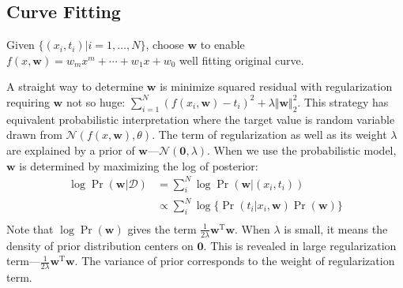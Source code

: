 \subsection{Curve Fitting}
Given $\{(x_{i},t_{i})|i=1,\ldots,N\}$, choose $\mathbf{w}$ to enable $f(x,\mathbf{w})=w_{m}x^{m}+\cdots+w_{1}x+w_0$ well fitting original curve.



A straight way to determine $\mathbf{w}$ is minimize squared residual with regularization requiring $\mathbf{w}$ not so huge: $\sum_{i=1}^{N}(f(x_i,\mathbf{w})-t_i)^{2}+\lambda\Vert\mathbf{w}\Vert_2^2$. 
This strategy has equivalent probabilistic interpretation where the target value is random variable drawn from $\mathcal{N}(f(x,\mathbf{w}),\theta)$. 
The term of regularization as well as its weight $\lambda$ are explained by a prior of $\mathbf{w}$---$\mathcal{N}(\mathbf{0},\lambda)$.
When we use the probabilistic model, $\mathbf{w}$ is determined by maximizing the log of posterior:
\begin{equation}
\begin{split}
\log\Pr(\mathbf{w}|\mathcal{D})&=\sum_{i}^{N}\log\Pr(\mathbf{w}|(x_i,t_i))\\
&\propto\sum_{i}^{N}\log\{\Pr(t_i|x_i,\mathbf{w})\Pr(\mathbf{w})\}\\
\end{split}
\label{eqn:curvefittingmap}
\end{equation}
Note that $\log\Pr(\mathbf{w})$ gives the term $\frac{1}{2\lambda}\mathbf{w}^{\mathrm{T}}\mathbf{w}$.
When $\lambda$ is small, it means the density of prior distribution centers on $\mathbf{0}$.
This is revealed in large regularization term---$\frac{1}{2\lambda}\mathbf{w}^{\mathrm{T}}\mathbf{w}$.
The variance of prior corresponds to the weight of regularization term.